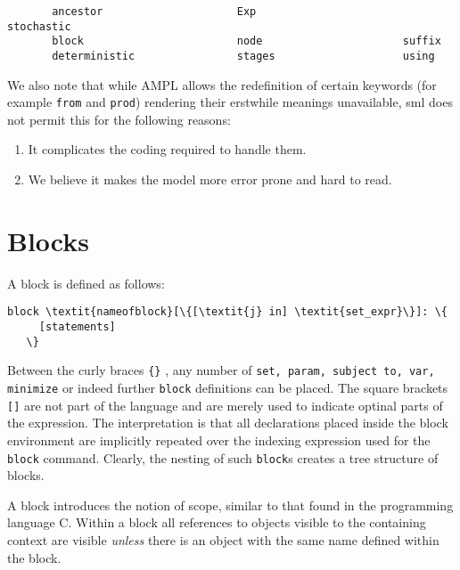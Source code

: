 \documentclass[10pt,a4paper]{report}
\begin{document}
\begin{verbatim}
       ancestor                     Exp                       stochastic
       block                        node                      suffix
       deterministic                stages                    using
\end{verbatim}

We also note that while AMPL allows the redefinition of certain keywords
(for example {\tt from} and {\tt prod}) rendering their erstwhile meanings
unavailable, sml does not permit this for the following reasons:
\begin{enumerate}
   \item It complicates the coding required to handle them.
   \item We believe it makes the model more error prone and hard to read.
\end{enumerate}

\section{Blocks}
A block is defined as follows:

\begin{Verbatim}[commandchars=\\\{\}]
   block \textit{nameofblock}[\{[\textit{j} in] \textit{set_expr}\}]: \{
     [statements]
   \}
\end{Verbatim}
Between the curly braces {\tt \{\}} , any number of {\tt set, param,
subject to, var, minimize} or indeed further {\tt block} definitions can be
placed. The square brackets {\tt []} are not part of the language and are
merely used to indicate optinal parts of the expression. The interpretation is
that all declarations placed inside the block environment are implicitly
repeated over the indexing expression used for the
{\tt block} command. Clearly, the nesting of such {\tt block}s creates a tree
structure of blocks.

A block introduces the notion of scope, similar to that found in the programming
language C. Within a block all references to objects visible to the containing
context are visible {\it unless} there is an object with the same name defined
within the block.
\end{document}

